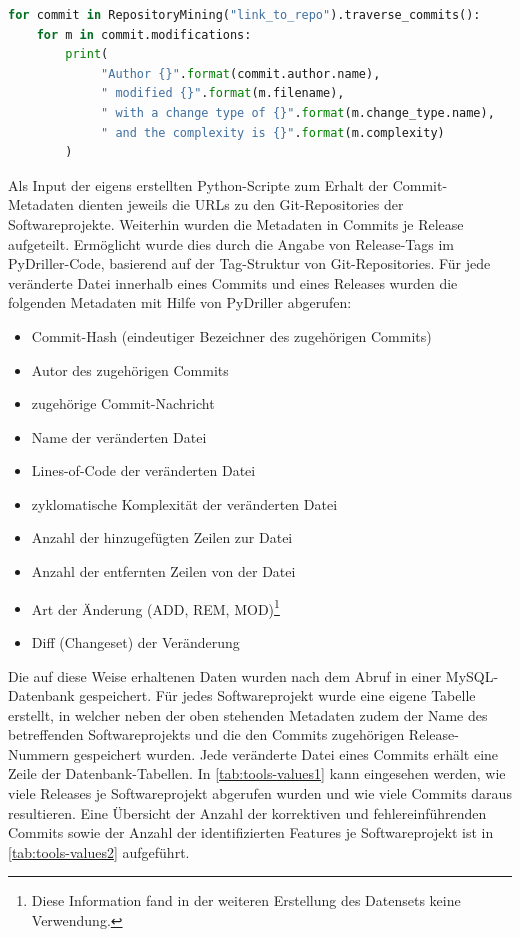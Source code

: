 \begin{lstlisting}[language=Python, caption=Beispielhafter PyDriller-Code zur Ausgabe von Metadaten von Commits, frame=single, label=pydriller]
for commit in RepositoryMining("link_to_repo").traverse_commits(): 
	for m in commit.modifications: 
		print( 
		     "Author {}".format(commit.author.name), 
		     " modified {}".format(m.filename), 
		     " with a change type of {}".format(m.change_type.name), 
		     " and the complexity is {}".format(m.complexity) 
		)
\end{lstlisting}

Als Input der eigens erstellten Python-Scripte zum Erhalt der Commit-Metadaten dienten jeweils die URLs zu den Git-Repositories der Softwareprojekte. Weiterhin wurden die Metadaten in Commits je Release aufgeteilt. Ermöglicht wurde dies durch die Angabe von Release-Tags im PyDriller-Code, basierend auf der Tag-Struktur von Git-Repositories. Für jede veränderte Datei innerhalb eines Commits und eines Releases wurden die folgenden Metadaten mit Hilfe von PyDriller abgerufen:

\begin{multicols}{2}
\begin{itemize}
\setlength{\itemsep}{-2pt}
\item Commit-Hash (eindeutiger Bezeichner des zugehörigen Commits)
\item Autor des zugehörigen Commits
\item zugehörige Commit-Nachricht
\item Name der veränderten Datei
\item Lines-of-Code der veränderten Datei
\item zyklomatische Komplexität der veränderten Datei
\item Anzahl der hinzugefügten Zeilen zur Datei
\item Anzahl der entfernten Zeilen von der Datei
\item Art der Änderung (ADD, REM, MOD)\footnote{Diese Information fand in der weiteren Erstellung des Datensets keine Verwendung.}
\item Diff (Changeset) der Veränderung
\end{itemize}
\end{multicols}

Die auf diese Weise erhaltenen Daten wurden nach dem Abruf in einer MySQL-Datenbank gespeichert. Für jedes Softwareprojekt wurde eine eigene Tabelle erstellt, in welcher neben der oben stehenden Metadaten zudem der Name des betreffenden Softwareprojekts und die den Commits zugehörigen Release-Nummern gespeichert wurden. Jede veränderte Datei eines Commits erhält eine Zeile der Datenbank-Tabellen. In \autoref{tab:tools-values1} kann eingesehen werden, wie viele Releases je Softwareprojekt abgerufen wurden und wie viele Commits daraus resultieren. Eine Übersicht der Anzahl der korrektiven und fehlereinführenden Commits sowie der Anzahl der identifizierten Features je Softwareprojekt ist in \autoref{tab:tools-values2} aufgeführt.

